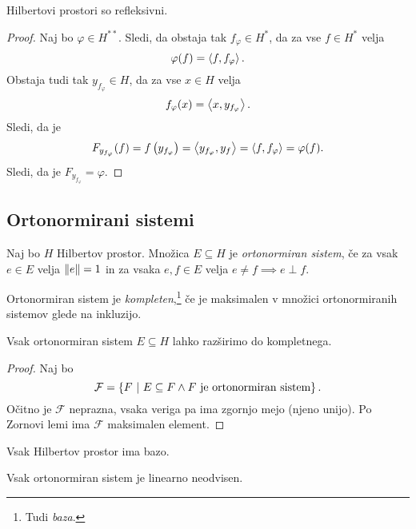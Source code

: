 \begin{posledica}
Hilbertovi prostori so refleksivni.
\end{posledica}

\begin{proof}
Naj bo $\varphi \in H^{**}$. Sledi, da obstaja tak
$f_\varphi \in H^*$, da za vse $f \in H^*$ velja
\[
\varphi(f) = \left\langle f,f_\varphi\right\rangle.
\]
Obstaja tudi tak $y_{f_\varphi} \in H$, da za vse $x \in H$ velja
\[
f_\varphi(x) = \left\langle x, y_{f_\varphi}\right\rangle.
\]
Sledi, da je
\[
F_{y_{f_\varphi}}(f) = f\left(y_{f_\varphi}\right) =
\left\langle y_{f_\varphi},y_f\right\rangle = \left\langle f, f_\varphi\right\rangle = \varphi(f).
\]
Sledi, da je $F_{y_{f_\varphi}} = \varphi$.
\end{proof}

\newpage

\subsection{Ortonormirani sistemi}


\begin{definicija}
Naj bo $H$ Hilbertov prostor. Množica $E \subseteq H$ je
\emph{ortonormiran sistem},
če za vsak $e \in E$ velja $\left\lVert e\right\rVert = 1$ in za vsaka $e, f \in E$
velja $e \ne f \implies e \perp f$.

Ortonormiran sistem je
\emph{kompleten},\footnote{Tudi \emph{baza}.} če je maksimalen v
množici ortonormiranih sistemov glede na inkluzijo.
\end{definicija}

\begin{trditev}
Vsak ortonormiran sistem $E \subseteq H$ lahko razširimo do
kompletnega.
\end{trditev}

\begin{proof}
Naj bo
\[
\mathcal{F} =
\left\{F~\middle\vert~E \subseteq F \land \text{$F$ je ortonormiran sistem}\right\}.
\]
Očitno je $\mathcal{F}$ neprazna, vsaka veriga pa ima zgornjo mejo
(njeno unijo). Po Zornovi lemi ima $\mathcal{F}$ maksimalen
element.
\end{proof}

\begin{posledica}
Vsak Hilbertov prostor ima bazo.
\end{posledica}

\begin{trditev}
Vsak ortonormiran sistem je linearno neodvisen.
\end{trditev}

